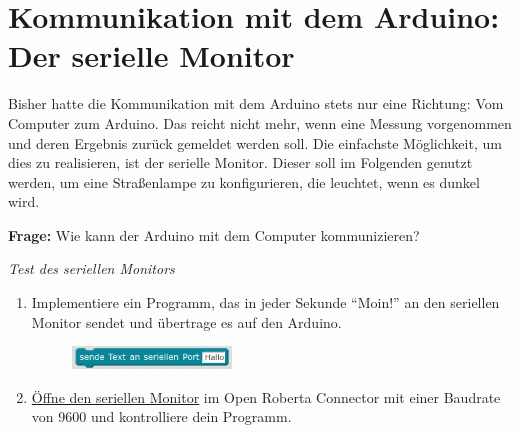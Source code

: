 \section{Kommunikation mit dem Arduino: Der serielle Monitor}
\label{sec:seriellermonitor}

Bisher hatte die Kommunikation mit dem Arduino stets nur eine Richtung: Vom Computer zum Arduino. Das reicht nicht mehr, wenn eine Messung vorgenommen und deren Ergebnis zurück gemeldet werden soll. Die einfachste Möglichkeit, um dies zu realisieren, ist der serielle Monitor. Dieser soll im Folgenden genutzt werden, um eine Straßenlampe zu konfigurieren, die leuchtet, wenn es dunkel wird.

\begin{ziel}
	\textbf{Frage:} Wie kann der Arduino mit dem Computer kommunizieren?
\end{ziel}

\begin{aufgabe} \emph{Test des seriellen Monitors}
	
	\vspace{-0.5\baselineskip}
	\begin{enumerate}[label=\alph*), itemsep=0ex, parsep=0mm]
		\item Implementiere ein Programm, das in jeder Sekunde \enquote{Moin!} an den seriellen Monitor sendet und übertrage es auf den Arduino.
		
		\begin{figure}[H]
			\centering
			\includegraphics[width=0.4\textwidth]{pics/serialprint.png}
		\end{figure}
		\vspace{-0.3\baselineskip}
		\item \href{https://jira.iais.fraunhofer.de/wiki/display/ORInfo/Vorbereitung+Nepo4Arduino#VorbereitungNepo4Arduino-SerialMonitor}{Öffne den seriellen Monitor} im Open Roberta Connector mit einer Baudrate von 9600 und kontrolliere dein Programm.
	\end{enumerate}
\end{aufgabe}

